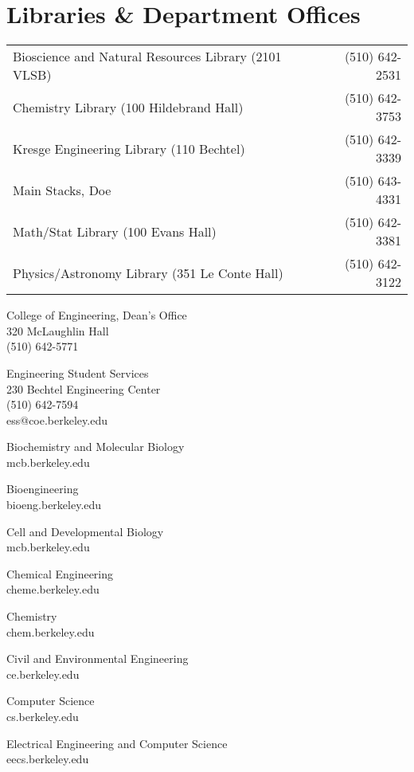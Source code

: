 \chapter*{Libraries \& Department Offices}

\begin{tabular}{lr}
  Bioscience and Natural Resources Library (2101 VLSB) & (510) 642-2531 \\
  Chemistry Library (100 Hildebrand Hall) & (510) 642-3753 \\
  Kresge Engineering Library (110 Bechtel) & (510) 642-3339 \\
  Main Stacks, Doe & (510) 643-4331 \\
  Math/Stat Library (100 Evans Hall) & (510) 642-3381 \\
  Physics/Astronomy Library (351 Le Conte Hall) & (510) 642-3122
\end{tabular}

College of Engineering, Dean’s Office \\
320 McLaughlin Hall \\
(510) 642-5771

Engineering Student Services \\
230 Bechtel Engineering Center \\
(510) 642-7594 \\
{\selectfont ess@coe.berkeley.edu}

Biochemistry and Molecular Biology \\
{\selectfont mcb.berkeley.edu}

Bioengineering \\
{\selectfont bioeng.berkeley.edu}

Cell and Developmental Biology \\
{\selectfont mcb.berkeley.edu}

Chemical Engineering \\
{\selectfont cheme.berkeley.edu}

Chemistry \\
{\selectfont chem.berkeley.edu}

Civil and Environmental Engineering \\
{\selectfont ce.berkeley.edu}

Computer Science \\
{\selectfont cs.berkeley.edu}

Electrical Engineering and Computer Science \\
{\selectfont eecs.berkeley.edu}

